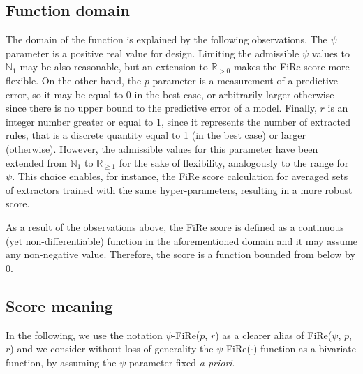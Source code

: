 \documentclass{article}
\newcommand{\fire}{FiRe}
\newcommand{\psifire}{$\psi$-\fire}
\begin{document}
\subsection{Function domain}\label{sec:fire-domain}
The domain of the function is explained by the following observations.
%
The $\psi$ parameter is a positive real value for design.
%
Limiting the admissible $\psi$ values to $\mathbb{N}_1$ may be also reasonable, but an extension to $\mathbb{R}_{>0}$ makes the \fire{} score more flexible.
%
On the other hand, the $p$ parameter is a measurement of a predictive error, so it may be equal to 0 in the best case, or arbitrarily larger otherwise since there is no upper bound to the predictive error of a model.
%
Finally, $r$ is an integer number greater or equal to 1, since it represents the number of extracted rules, that is a discrete quantity equal to 1 (in the best case) or larger (otherwise).
%
However, the admissible values for this parameter have been extended from $\mathbb{N}_1$ to $\mathbb{R}_{\geq 1}$ for the sake of flexibility, analogously to the range for $\psi$.
%
This choice enables, for instance, the \fire{} score calculation for averaged sets of extractors trained with the same hyper-parameters, resulting in a more robust score.

As a result of the observations above, the \fire{} score is defined as a continuous (yet non-differentiable) function in the aforementioned domain and it may assume any non-negative value.
%
Therefore, the score is a function bounded from below by 0.

\subsection{Score meaning}\label{sec:fire-meaning}

In the following, we use the notation \psifire{}($p$, $r$) as a clearer alias of \fire{}($\psi$, $p$, $r$) and we consider without loss of generality the \psifire{}($\cdot$) function as a bivariate function, by assuming the $\psi$ parameter fixed \emph{a priori}.
\end{document}
